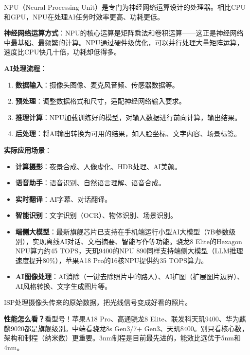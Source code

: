 
NPU（Neural Processing Unit）是专门为神经网络运算设计的处理器。相比CPU和GPU，NPU在处理AI任务时效率更高、功耗更低。

\textbf{神经网络运算方式}：NPU的核心运算是矩阵乘法和卷积运算——这正是神经网络中最基础、最频繁的计算。NPU通过硬件级优化，可以并行处理大量矩阵运算，速度比CPU快几十倍，功耗却低得多。

\textbf{AI处理流程}：

\begin{enumerate}
  \item \textbf{数据输入}：摄像头图像、麦克风音频、传感器数据等。
  \item \textbf{预处理}：调整数据格式和尺寸，适配神经网络输入要求。
  \item \textbf{推理计算}：NPU加载训练好的模型，对输入数据进行前向计算，输出结果。
  \item \textbf{后处理}：将AI输出转换为可用的结果，如人脸坐标、文字内容、场景标签。
\end{enumerate}

\textbf{实际应用场景}：

\begin{itemize}
  \item \textbf{计算摄影}：夜景合成、人像虚化、HDR处理、AI美颜。
  \item \textbf{语音助手}：语音识别、自然语言理解、语音合成。
  \item \textbf{实时翻译}：AI字幕、对话翻译。
  \item \textbf{智能识别}：文字识别（OCR）、物体识别、场景识别。
  \item \textbf{端侧大模型}：最新旗舰芯片已支持在手机端运行小型AI大模型（7B参数级别），实现离线AI对话、文档摘要、智能写作等功能。骁龙8 Elite的Hexagon NPU算力约45 TOPS，天玑9400的NPU 890同样支持端侧大模型（LLM推理速度提升80\%），苹果A18 Pro的16核NPU提供约35 TOPS算力。
  \item \textbf{AI图像处理}：AI消除（一键去除照片中的路人）、AI扩图（扩展图片边界）、AI风格转换、文字生成图片等。
\end{itemize}


ISP处理摄像头传来的原始数据，把光线信号变成好看的照片。

\textbf{性能怎么看？}看型号！苹果A18 Pro、高通骁龙8 Elite、联发科天玑9400、华为麒麟9020都是旗舰级别。中端看骁龙8s Gen3/7+ Gen3、天玑8400。别只看核心数，架构和制程（纳米数）更重要。3nm制程是目前最先进的，能效比远优于5nm和4nm。

